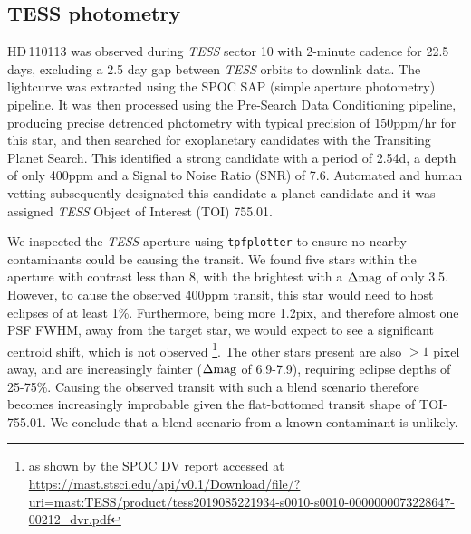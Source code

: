 \documentclass[fleqn,usenatbib]{mnras}
\newcommand{\tess}{{\it TESS}}
\newcommand{\Tstar}{HD\,110113}
\begin{document}
\subsection{TESS photometry}
\Tstar{} was observed during \tess{} sector 10 with 2-minute cadence for 22.5 days, excluding a 2.5 day gap between \tess{} orbits to downlink data.
The lightcurve was extracted using the SPOC \citep[Science Processing Operations Centre][]{jenkins2016tess} SAP (simple aperture photometry) pipeline.
It was then processed using the Pre-Search Data Conditioning \citep[PDC,][]{stumpe2012kepler} pipeline, producing precise detrended photometry with typical precision of 150ppm/hr for this star, and then searched for exoplanetary candidates with the Transiting Planet Search.
This identified a strong candidate with a period of 2.54d, a depth of only 400ppm and a Signal to Noise Ratio (SNR) of 7.6.
Automated and human vetting subsequently designated this candidate a planet candidate and it was assigned \tess{} Object of Interest (TOI) 755.01. 

We inspected the \tess{} aperture using \texttt{tpfplotter} \citep[plotted in Figure \ref{fig:tpf};][]{2020A&A...635A.128A} to ensure no nearby contaminants could be causing the transit.
We found five stars within the aperture with contrast less than 8, with the brightest with a $\Delta{\rm mag}$ of only 3.5.
However, to cause the observed 400ppm transit, this star would need to host eclipses of at least 1\%. 
Furthermore, being more 1.2pix, and therefore almost one PSF FWHM, away from the target star, we would expect to see a significant centroid shift, which is not observed \footnote{as shown by the SPOC DV report accessed at \url{https://mast.stsci.edu/api/v0.1/Download/file/?uri=mast:TESS/product/tess2019085221934-s0010-s0010-0000000073228647-00212_dvr.pdf}}.
The other stars present are also $>1$ pixel away, and are increasingly fainter ($\Delta{\rm mag}$ of 6.9-7.9), requiring eclipse depths of 25-75\%.
Causing the observed transit with such a blend scenario therefore becomes increasingly improbable given the flat-bottomed transit shape of TOI-755.01.
We conclude that a blend scenario from a known contaminant is unlikely.
\end{document}
